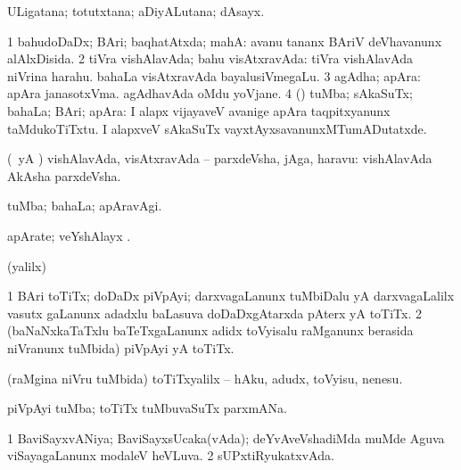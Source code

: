 \bentry
{} 
\gl{\nA}
\expl{}
\bmng
 ULigatana; totutxtana; aDiyALutana; dAsayx. 
\emng
\eentry

\bentry
{} 
\gl{\gu}
\expl{}
\bmng
\bnum
\num{1} bahudoDaDx; BAri; baqhatAtxda; mahA:  avanu tananx BAriV deVhavanunx alAlxDisida. 
\num{2} tiVra vishAlavAda; bahu visAtxravAda:  tiVra vishAlavAda niVrina harahu.  bahaLa visAtxravAda bayalusiVmegaLu. 
\num{3} agAdha; apAra:  apAra janasotxVma.  agAdhavAda oMdu yoVjane. 
\num{4} (\AmA) tuMba; sAkaSuTx; bahaLa; BAri; apAra:  I alapx vijayaveV avanige apAra taqpitxyanunx taMdukoTiTxtu.  I alapxveV sAkaSuTx vayxtAyxsavanunxMTumADutatxde. 
\enum
\emng
\eentry

\bentry
{} 
\gl{\nA}
\expl{}
\bmng
 (\kAparx\ yA \rUpa) vishAlavAda, visAtxravAda -- parxdeVsha, jAga, haravu:  vishAlavAda AkAsha parxdeVsha. 
\emng
\eentry


\bentry
{} 
\gl{\kirxvi}
\expl{}
\bmng
 tuMba; bahaLa; apAravAgi. 
\emng
\eentry

\bentry
{} 
\gl{\nA}
\expl{}
\bmng
 apArate; veYshAlayx 
\emng
. \eentry

\bentry
{} 
\gl{\saMkiSx}
\expl{}
\bmng
(\UK yalilx)  
\emng
\eentry

\bentry
{} 
\gl{\nA}
\expl{}
\bmng
\bnum
\num{1} BAri toTiTx; doDaDx piVpAyi; darxvagaLanunx tuMbiDalu yA darxvagaLalilx vasutx gaLanunx adadxlu baLasuva doDaDxgAtarxda pAterx yA toTiTx. 
\num{2} (baNaNxkaTaTxlu baTeTxgaLanunx adidx toVyisalu raMganunx berasida niVranunx tuMbida) piVpAyi yA toTiTx. 
\enum
\emng
\eentry

\bentry
{} 
\gl{\sakirx}
\bmng
 (raMgina niVru tuMbida) toTiTxyalilx -- hAku, adudx, toVyisu, nenesu. 
\emng
\eentry

\bentry
{} 
\gl{\nA}
\bmng
piVpAyi tuMba; toTiTx tuMbuvaSuTx parxmANa. 
\emng
\eentry

\bentry
{} 
\gl{\gu}
\expl{}
\bmng
\bnum
\num{1} BaviSayxvANiya; BaviSayxsUcaka(vAda); deYvAveVshadiMda muMde Aguva viSayagaLanunx modaleV heVLuva. 
\num{2} sUPxtiRyukatxvAda. 
\enum
\emng
\eentry

